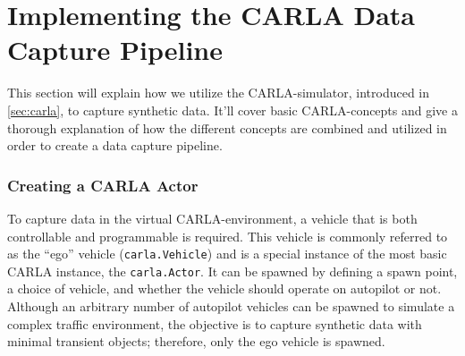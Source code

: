 \section{Implementing the CARLA Data Capture Pipeline}
This section will explain how we utilize the CARLA-simulator, introduced in \autoref{sec:carla}, to capture synthetic data. It'll cover basic CARLA-concepts and give a thorough explanation of how the different concepts are combined and utilized in order to create a data capture pipeline.

\begin{comment}

Premise: Have no data to train a NeRF on
Question: How can we collect synthetic data from CARLA?

\begin{itemize}
    \item How can you spawn an agent, etc?
    \item How does all the basic CARLA-things work? 
    \item How to mount cameras, which sensors, location and rotation (transform).
\end{itemize}
\end{comment}

\begin{comment}
    
\subsubsection{Connecting the CARLA API to a CARLA simulator}
I might add something here about how the data flows in the CARLA setup.

In order to run experiments 
\end{comment}



\subsubsection{Creating a CARLA Actor}
To capture data in the virtual CARLA-environment, a vehicle that is both controllable and programmable is required. This vehicle is commonly referred to as the “ego” vehicle (\texttt{carla.Vehicle}) and is a special instance of the most basic CARLA instance, the \texttt{carla.Actor}. It can be spawned by defining a spawn point, a choice of vehicle, and whether the vehicle should operate on autopilot or not. Although an arbitrary number of autopilot vehicles can be spawned to simulate a complex traffic environment, the objective is to capture synthetic data with minimal transient objects; therefore, only the ego vehicle is spawned.


